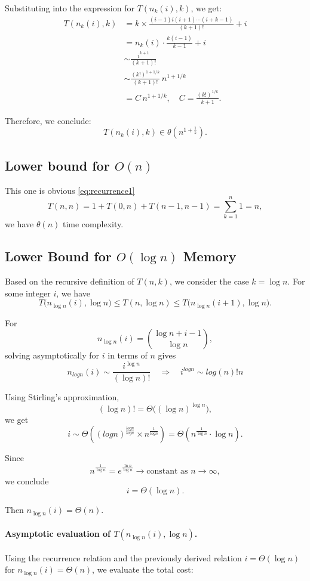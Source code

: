 \documentclass[a4paper,10pt]{article}
\begin{document}
Substituting into the expression for \( T(n_k(i), k) \), we get:
\begin{align*}
T(n_k(i), k) 
&= k \times \frac{(i-1)i(i+1)\cdots(i+k-1)}{(k+1)!} + i \\[2mm]
&= n_k(i) \cdot \frac{k(i-1)}{k-1} + i \\[1mm]
&\sim \frac{i^{k+1}}{(k+1)!} \\[1mm]
&\sim \frac{(k!)^{1+1/k}}{(k+1)!}\, n^{1+1/k} \\[1mm]
&= C\, n^{1+1/k}, \quad C = \frac{(k!)^{1/k}}{k+1}.
\end{align*}

Therefore, we conclude:
\[
T(n_k(i), k) \in \theta\left(n^{1 + \frac{1}{k}}\right).
\]

\subsection{Lower bound for \( O(n) \)}
This one is obvious
\ref{eq:recurrence1}
\[
T(n, n) = 1 + T(0,n) + T(n-1,n-1) = \sum_{k=1}^{n} 1 = n,
\]
we have \( \theta(n) \) time complexity.

\subsection{Lower Bound for \( O(\log n) \) Memory}

Based on the recursive definition of \( T(n,k) \), we consider the case \( k = \log n \). 
For some integer \( i \), we have
\[
T\big(n_{\log n}(i), \log n\big) \leq T(n, \log n) \leq T\big(n_{\log n}(i+1), \log n\big).
\]

For
\[
n_{\log n}(i) = \binom{\log n + i - 1}{\log n},
\]
solving asymptotically for \( i \) in terms of \( n \) gives
\[
n_{log n}(i) \sim \frac{ i^{\log n}}{(\log n)!}
\quad \Longrightarrow \quad
i^{log n} \sim log(n)! n
\]

Using Stirling’s approximation,
\[
(\log n)! = \Theta\big( (\log n)^{\log n} \big),
\]
we get
\[
i \sim \Theta((log n)^{\frac{log n}{log n}} \times n^{\frac{1}{log n}})
  = \Theta\!\left( n^{\frac{1}{\log n}} \cdot \log n \right).
\]

Since
\[
n^{\frac{1}{\log n}} = e^{\frac{\ln n}{\log n}} \to \text{constant as } n \to \infty,
\]
we conclude
\[
i = \Theta(\log n).
\]

Then \(n_{\log n}(i) = \Theta(n)\).

\paragraph{Asymptotic evaluation of \(T(n_{\log n}(i), \log n)\).} 
Using the recurrence relation and the previously derived relation \(i = \Theta(\log n)\) for \(n_{\log n}(i) = \Theta(n)\), we evaluate the total cost:
\end{document}
